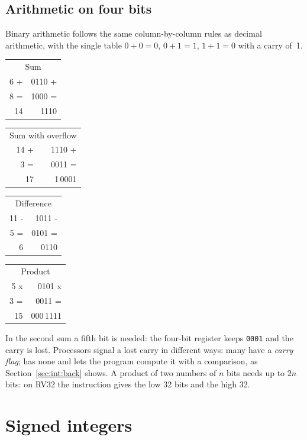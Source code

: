 \subsection{Arithmetic on four bits}

Binary arithmetic follows the same column-by-column rules as decimal
arithmetic, with the single table $0+0=0$, $0+1=1$, $1+1=0$ with a carry
of~1.

\begin{center}\ttfamily
\begin{tabular}{@{}r@{\quad}r@{}}
\multicolumn{2}{c}{\textsf{\small Sum}}\\
6 + & 0110 +\\ 8 = & 1000 =\\\hline 14 & 1110
\end{tabular}\qquad
\begin{tabular}{@{}r@{\quad}r@{}}
\multicolumn{2}{c}{\textsf{\small Sum with overflow}}\\
14 + & 1110 +\\ 3 = & 0011 =\\\hline 17 & \textcolor{prgred}{1}\,0001
\end{tabular}\qquad
\begin{tabular}{@{}r@{\quad}r@{}}
\multicolumn{2}{c}{\textsf{\small Difference}}\\
11 - & 1011 -\\ 5 = & 0101 =\\\hline 6 & 0110
\end{tabular}\qquad
\begin{tabular}{@{}r@{\quad}r@{}}
\multicolumn{2}{c}{\textsf{\small Product}}\\
5 x & 0101 x\\ 3 = & 0011 =\\\hline 15 & 000\,1111
\end{tabular}
\end{center}

In the second sum a fifth bit is needed: the four-bit register keeps
\texttt{0001} and the carry is lost. Processors signal a lost carry in
different ways: many have a \emph{carry flag}; \riscv has none and lets the
program compute it with a comparison, as Section~\ref{sec:int:back} shows. A
product of two numbers of $n$ bits needs up to $2n$ bits: on RV32 the
instruction  gives the low 32 bits and  the high 32.

\section{Signed integers}

